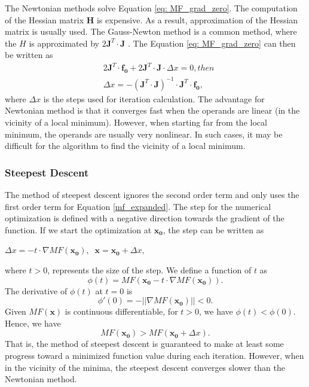 The Newtonian methods solve Equation \ref{eq: MF_grad_zero}. The computation of the Hessian matrix $\pmb{H}$ is expensive. As a result, approximation of the Hessian matrix is usually used. The Gauss-Newton method is a common method, where the $H$ is approximated by $2\pmb{J}^T \cdot \pmb{J}$ . The Equation \ref{eq: MF_grad_zero} can then be written as 
\begin{equation} \label{eq: gauss-newton}
\begin{split}
&2 \pmb{J}^{T} \cdot \pmb{f_0} + 2\pmb{J}^T \cdot \pmb{J} \cdot \Delta x = 0 ,  then\\
&\Delta x = - (\pmb{J}^T \cdot \pmb{J} )^{-1} \cdot \pmb{J}^{T} \cdot \pmb{f_0},
\end{split}
\end{equation}
where $\Delta x$ is the steps used for iteration calculation. 
The advantage for Newtonian method is that it converges fast when the operands are linear (in the vicinity of a local minimum). However, when starting far from the local minimum, the operands are usually very nonlinear. In such cases, it may be difficult for the algorithm to find the vicinity of a local minimum. 
\newline

\subsubsection{Steepest Descent}

The method of steepest descent  ignores the second order term and only uses the first order term for  Equation \ref{mf_expanded}. The step for the numerical optimization is defined with a negative direction towards the gradient of the function. If we start the optimization at $\pmb{x_0}$, the step can be written as
\medskip
\newline
\begin{center}
$
\Delta x = - t \cdot \nabla MF(\pmb{x_0}), \;\; \pmb{x} = \pmb{x_0} + \Delta x,
$
\end{center}
\medskip
where $t>0$, represents the size of the step. We define a function of $t$ as 
\begin{equation} \label{eq: function of t}
\phi(t) = MF(\pmb{x_0} - t \cdot \nabla MF(\pmb{x_0})).
\end{equation}The derivative of $\phi(t)$ at $t=0$ is
\begin{equation}\label{t=0}
\phi'(0) = - \vert\vert \nabla MF(\pmb{x_0}) \vert \vert < 0.
\end{equation}Given $MF(\pmb{x})$ is continuous differentiable, for $t>0$, we have $\phi(t) < \phi(0)$. Hence, we have
\begin{equation}
MF(\pmb{x_0}) > MF(\pmb{x_0} + \Delta x).
\end{equation}That is, the method of steepest descent is guaranteed to make at least some progress toward a minimized function value during each iteration. However, when in the vicinity of the minima, the steepest descent converges slower than the Newtonian method.
\newline

